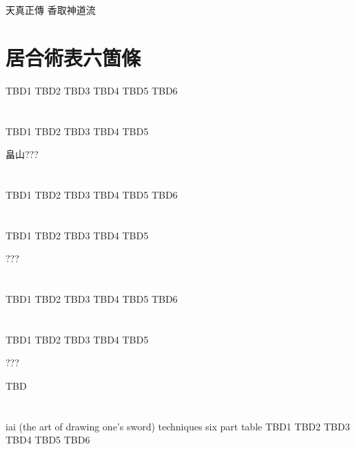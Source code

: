 \documentclass[dvipdfmx, a4paper, 12pt]{utarticle}
\begin{document}
\begin{CJK*}{UTF8}{min}
\CJKtilde
\begin{landscape}

\newpage
\pagestyle{empty}
天真正傳
香取神道流
\section{居合術表六箇條}
TBD1
TBD2
TBD3
TBD4
TBD5
TBD6
\section{}
TBD1
TBD2
TBD3
TBD4
TBD5

畠山???

\newpage
\pagestyle{empty}
\section{}
TBD1
TBD2
TBD3
TBD4
TBD5
TBD6
\section{}
TBD1
TBD2
TBD3
TBD4
TBD5

???

\newpage
\pagestyle{empty}
\section{}
TBD1
TBD2
TBD3
TBD4
TBD5
TBD6
\section{}
TBD1
TBD2
TBD3
TBD4
TBD5

???

\newpage
\pagestyle{empty}
TBD
\section{}
iai (the art of drawing one's sword) techniques six part table
TBD1
TBD2
TBD3
TBD4
TBD5
TBD6

\end{landscape}
\end{CJK*}
\end{document}
